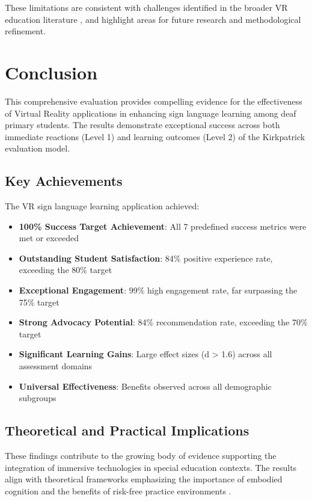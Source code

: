 \documentclass[12pt,a4paper]{article}
\begin{document}
These limitations are consistent with challenges identified in the broader VR education literature \citep{dhimolea2022systematic}, and highlight areas for future research and methodological refinement.

\section{Conclusion}

This comprehensive evaluation provides compelling evidence for the effectiveness of Virtual Reality applications in enhancing sign language learning among deaf primary students. The results demonstrate exceptional success across both immediate reactions (Level 1) and learning outcomes (Level 2) of the Kirkpatrick evaluation model.

\subsection{Key Achievements}

The VR sign language learning application achieved:

\begin{itemize}
    \item \textbf{100\% Success Target Achievement}: All 7 predefined success metrics were met or exceeded
    \item \textbf{Outstanding Student Satisfaction}: 84\% positive experience rate, exceeding the 80\% target
    \item \textbf{Exceptional Engagement}: 99\% high engagement rate, far surpassing the 75\% target
    \item \textbf{Strong Advocacy Potential}: 84\% recommendation rate, exceeding the 70\% target
    \item \textbf{Significant Learning Gains}: Large effect sizes (d > 1.6) across all assessment domains
    \item \textbf{Universal Effectiveness}: Benefits observed across all demographic subgroups
\end{itemize}

\subsection{Theoretical and Practical Implications}

These findings contribute to the growing body of evidence supporting the integration of immersive technologies in special education contexts. The results align with theoretical frameworks emphasizing the importance of embodied cognition \citep{lin2024design} and the benefits of risk-free practice environments \citep{alawajee2021influence}.
\end{document}

